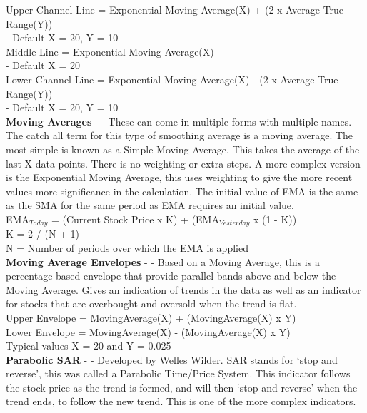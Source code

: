 \documentclass[12pt,a4paper]{article}
\begin{document}
\noindent
Upper Channel Line = Exponential Moving Average(X) + (2 x Average True Range(Y))\\ - Default X = 20, Y = 10 \\
Middle Line = Exponential Moving Average(X)\\ - Default X = 20 \\
Lower Channel Line = Exponential Moving Average(X) - (2 x Average True Range(Y))\\ - Default X = 20, Y = 10 \\

\iffalse
[]
\fi

\noindent
\textbf{Moving Averages} - \cite{Murphy1999} - These can come in multiple forms with multiple names. The catch all term for this type of smoothing average is a moving average. The most simple is known as a Simple Moving Average. This takes the average of the last X data points. There is no weighting or extra steps. A more complex version is the Exponential Moving Average, this uses weighting to give the more recent values more significance in the calculation. The initial value of EMA is the same as the SMA for the same period as EMA requires an initial value.\\

\noindent
EMA$_{Today}$ = (Current Stock Price x K) + (EMA$_{Yesterday}$ x (1 - K)) \\
K = 2 / (N + 1) \\
N = Number of periods over which the EMA is applied \\

\iffalse
[]
\fi

\noindent
\textbf{Moving Average Envelopes} - \cite{Murphy1999} - Based on a Moving Average, this is a percentage based envelope that provide parallel bands above and below the Moving Average. Gives an indication of trends in the data as well as an indicator for stocks that are overbought and oversold when the trend is flat.\\

\noindent
Upper Envelope = MovingAverage(X) + (MovingAverage(X) x Y)\\
Lower Envelope = MovingAverage(X) - (MovingAverage(X) x Y)\\
Typical values X = 20 and Y = 0.025\\

\iffalse
[]
\fi

\noindent
\textbf{Parabolic SAR} - \cite{Wilder1978} - Developed by Welles Wilder. SAR stands for `stop and reverse', this was called a Parabolic Time/Price System. This indicator follows the stock price as the trend is formed, and will then `stop and reverse' when the trend ends, to follow the new trend. This is one of the more complex indicators.\\
\end{document}
